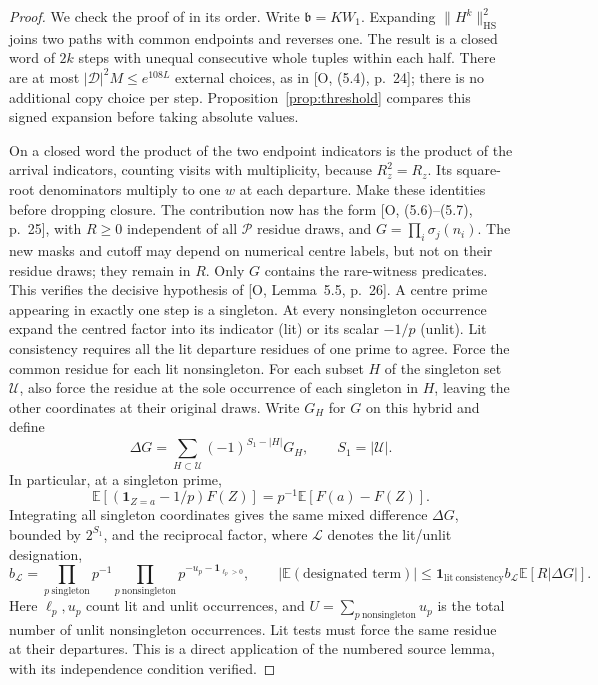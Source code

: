 \documentclass[11pt]{article}
\theoremstyle{definition}
\newcommand{\E}{\mathbb E}
\newcommand{\ind}{\mathbf 1}
\DeclareMathOperator{\HS}{HS}
\newcommand{\Pset}{\mathcal P}
\theoremstyle{remark}
\numberwithin{equation}{section}
\newcommand{\Dset}{\mathcal D}
\begin{document}
\begin{proof}
We check the proof of \cite[Theorem~5.4, pp.~24--38]{OpenAI007} in its order.
Write $\mathfrak b=KW_1$. Expanding $\|H^k\|_{\HS}^2$ joins two paths with common endpoints and reverses one.
The result is a closed word of $2k$ steps with unequal consecutive whole tuples within each half. There are at
most $|\Dset|^2M\le e^{108L}$ external choices, as in [O, (5.4), p.~24]; there is no additional copy choice per
step. Proposition~\ref{prop:threshold} compares this signed expansion before taking absolute values.

On a closed word the product of the two endpoint indicators is the product of the arrival indicators, counting
visits with multiplicity, because $R_z^2=R_z$. Its square-root denominators multiply to one $w$ at each departure.
Make these identities before dropping closure. The contribution now has the form [O, (5.6)--(5.7), p.~25], with
$R\ge0$ independent of all $\Pset$ residue draws, and $G=\prod_i\sigma_j(n_i)$.
The new masks and cutoff may depend on numerical centre labels, but not on their residue draws; they remain in
$R$. Only $G$ contains the rare-witness predicates. This verifies the decisive hypothesis of
[O, Lemma~5.5, p.~26]. A centre prime appearing in exactly one step is a singleton.
At every nonsingleton occurrence expand the centred factor into its indicator (lit) or its scalar $-1/p$ (unlit).
Lit consistency requires all the lit departure residues of one prime to agree.
Force the common residue for each lit nonsingleton. For each subset $H$ of the singleton set $\mathcal U$, also
force the residue at the sole occurrence of each singleton in $H$, leaving the other coordinates at their original
draws. Write $G_H$ for $G$ on this hybrid and define
\begin{equation}\label{eq:mixed-difference}
 \Delta G=\sum_{H\subset\mathcal U}(-1)^{S_1-|H|}G_H,\qquad S_1=|\mathcal U|.
\end{equation}
In particular, at a singleton prime,
\begin{equation}\label{eq:singleton-identity}
 \E[(\ind_{Z=a}-1/p)F(Z)]=p^{-1}\E[F(a)-F(Z)].
\end{equation}
Integrating all singleton coordinates gives the same mixed difference $\Delta G$, bounded by $2^{S_1}$,
and the reciprocal factor, where $\mathcal L$ denotes the lit/unlit designation,
\begin{equation}\label{eq:lit-reciprocals}
 b_{\mathcal L}=\prod_{p\ \mathrm{singleton}}p^{-1}
 \prod_{p\ \mathrm{nonsingleton}}p^{-u_p-\ind_{\ell_p>0}},\qquad
 |\E(\text{designated term})|\le\ind_{\mathrm{lit\ consistency}}b_{\mathcal L}\E[R|\Delta G|].
\end{equation}
Here $\ell_p,u_p$ count lit and unlit occurrences,
and $U=\sum_{p\ \mathrm{nonsingleton}}u_p$ is the total number of unlit nonsingleton occurrences.
Lit tests must force the same residue at their departures.
This is a direct application of the numbered source lemma, with its independence condition verified.


\end{proof}
\end{document}
